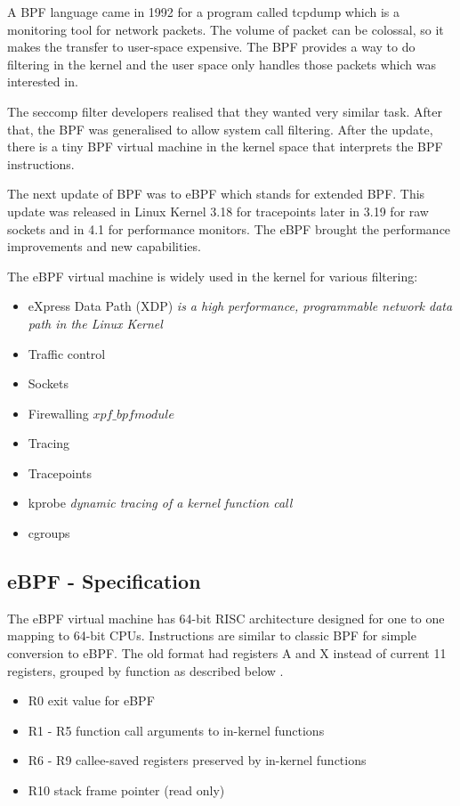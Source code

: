 A BPF language came in 1992 for a program called tcpdump which is a monitoring tool for network packets.
The volume of packet can be colossal, so it makes the transfer to user-space expensive.
The BPF provides a way to do filtering in the kernel and the user space only handles those packets which was interested in.

The seccomp filter developers realised that they wanted very similar task.
After that, the BPF was generalised to allow system call filtering.
After the update, there is a tiny BPF virtual machine in the kernel space that interprets the BPF instructions.

The next update of BPF was to eBPF which stands for extended BPF.
This update was released in Linux Kernel 3.18 for tracepoints later in 3.19 for raw sockets and in 4.1 for performance monitors.
The eBPF brought the performance improvements and new capabilities.

The eBPF virtual machine is widely used in the kernel for various filtering:
\begin{itemize}
	\item eXpress Data Path (XDP) \textit{is a high performance, programmable network data path in the Linux Kernel}
    \item Traffic control
    \item Sockets
    \item Firewalling \textit{\(xpf\_bpf module\)}
    \item Tracing
    \item Tracepoints
    \item kprobe \textit{dynamic tracing of a kernel function call}
    \item cgroups
\end{itemize}

\subsection{eBPF - Specification}
The eBPF virtual machine has 64-bit RISC architecture designed for one to one mapping to 64-bit CPUs.
Instructions are similar to classic BPF for simple conversion to eBPF.
The old format had registers A and X instead of current 11 registers, grouped by function as described below \cite{kernel_bpf_specification}.
\pagebreak
\begin{itemize}
\item R0 exit value for eBPF
\item R1 - R5 function call arguments to in-kernel functions
\item R6 - R9 callee-saved registers preserved by in-kernel functions
\item R10 stack frame pointer (read only)
\end{itemize}

